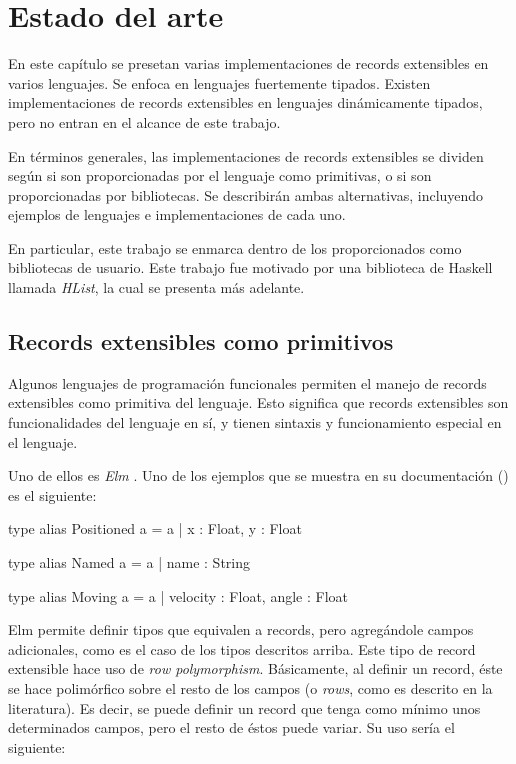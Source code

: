 
\chapter{Estado del arte}
\label{ch:2}
En este capítulo se presetan varias implementaciones de records extensibles en varios lenguajes. Se enfoca en lenguajes fuertemente tipados. Existen implementaciones de records extensibles en lenguajes dinámicamente tipados, pero no entran en el alcance de este trabajo.

En términos generales, las implementaciones de records extensibles se dividen según si son proporcionadas por el lenguaje como primitivas, o si son proporcionadas por bibliotecas. Se describirán ambas alternativas, incluyendo ejemplos de lenguajes e implementaciones de cada uno.

En particular, este trabajo se enmarca dentro de los proporcionados como bibliotecas de usuario. Este trabajo fue motivado por una biblioteca de Haskell llamada \textit{HList}, la cual se presenta más adelante.

\section{Records extensibles como primitivos}

Algunos lenguajes de programación funcionales permiten el manejo de records extensibles como primitiva del lenguaje. Esto significa que records extensibles son funcionalidades del lenguaje en sí, y tienen sintaxis y funcionamiento especial en el lenguaje.

Uno de ellos es \textit{Elm} \cite{Czaplicki:2013:AFR:2499370.2462161}. Uno de los ejemplos que se muestra en su documentación (\cite{ElmRecords}) es el siguiente:

\begin{code}
type alias Positioned a =
  { a | x : Float, y : Float }

type alias Named a =
  { a | name : String }

type alias Moving a =
  { a | velocity : Float, angle : Float }
\end{code}

Elm permite definir tipos que equivalen a records, pero agregándole campos adicionales, como es el caso de los tipos descritos arriba. Este tipo de record extensible hace uso de \textit{row polymorphism}. Básicamente, al definir un record, éste se hace polimórfico sobre el resto de los campos (o \textit{rows}, como es descrito en la literatura). Es decir, se puede definir un record que tenga como mínimo unos determinados campos, pero el resto de éstos puede variar. Su uso sería el siguiente:

